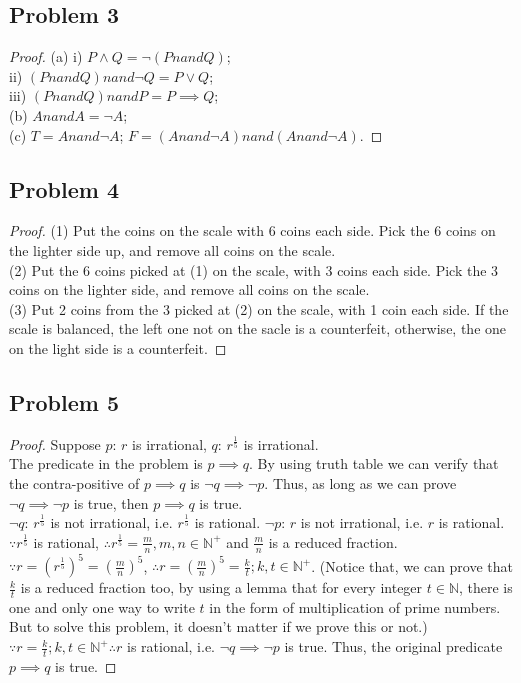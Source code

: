 \documentclass{article}
\begin{document}
\subsection{Problem 3}
\begin{proof}
(a) i) $P \wedge Q = \neg (P nand Q)$; \\
ii) $(P nand Q) nand \neg Q = P \vee Q$; \\
iii) $(P nand Q) nand P = P \implies Q$; \\
(b) $A nand A = \neg A$; \\
(c) $T = A nand \neg A$; $F = (A nand \neg A) nand (A nand \neg A)$.
\end{proof}
\subsection{Problem 4}
\begin{proof}
(1) Put the coins on the scale with 6 coins each side. Pick the 6 coins on the lighter side up, and remove all coins on the scale. \\
(2) Put the 6 coins picked at (1) on the scale, with 3 coins each side. Pick the 3 coins on the lighter side, and remove all coins on the scale. \\
(3) Put 2 coins from the 3 picked at (2) on the scale, with 1 coin each side. If the scale is balanced, the left one not on the sacle is a counterfeit, otherwise, the one on the light side is a counterfeit.
\end{proof}
\subsection{Problem 5}
\begin{proof}
Suppose $p$: $r$ is irrational, $q$: $r^{\frac{1}{5}}$ is irrational.
\\ The predicate in the problem is $p \implies q$. By using truth table we can verify that the contra-positive of $p \implies q$ is $\neg q \implies \neg p$. Thus, as long as we can prove $\neg q \implies \neg p$ is true, then $p \implies q$ is true. \\
$\neg q$: $r^{\frac{1}{5}}$ is not irrational, i.e. $r^{\frac{1}{5}}$ is rational.
$\neg p$: $r$ is not irrational, i.e. $r$ is rational.
\\ $\because r^{\frac{1}{5}}$ is rational, $\therefore r^{\frac{1}{5}}=\frac{m}{n}, m,n \in \mathbb{N}^+$ and $\frac{m}{n}$ is a reduced fraction. \\
$\because r = (r^{\frac{1}{5}})^{5} = (\frac{m}{n})^5$, $\therefore r = (\frac{m}{n})^5 = \frac{k}{t}; k,t \in \mathbb{N}^+$. (Notice that, we can prove that $\frac{k}{t}$ is a reduced fraction too, by using a lemma that for every integer $t \in \mathbb{N}$, there is one and only one way to write $t$ in the form of multiplication of prime numbers. But to solve this problem, it doesn't matter if we prove this or not.)
\\ $\because r = \frac{k}{t}; k,t \in \mathbb{N}^+ \therefore r$ is rational, i.e. $\neg q \implies \neg p$ is true. Thus, the original predicate $p \implies q$ is true.
\end{proof}
\end{document}

